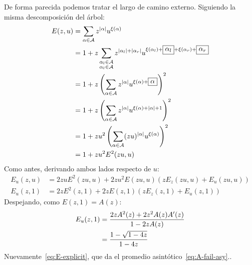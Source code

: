   De forma parecida podemos tratar el largo de camino externo.%
  Siguiendo la misma descomposición del árbol:
  \begin{align}
    E(z, u)
      &= \sum_{\alpha \in \mathcal{A}}
	   z^{\lvert \alpha \rvert} u^{\xi(\alpha)}
	   \label{E-bgf-decomposed} \\
      &= 1 + z \sum_{\substack{\alpha_l \in \mathcal{A} \\
			       \alpha_l \in \mathcal{A}}}
		 z^{\lvert \alpha_l \rvert + \lvert \alpha_r \rvert}
		 u^{\xi(\alpha_l) + \boxed{\alpha_l}
		     + \xi(\alpha_r) + \boxed{\alpha_r}} \notag \\
      &= 1 + z \left(
		 \sum_{\alpha \in \mathcal{A}}
		   z^{\lvert \alpha \rvert}
		   u^{\xi(\alpha) + \boxed{\alpha}}
	       \right)^2 \notag \\
      &= 1 + z \left(
		 \sum_{\alpha \in \mathcal{A}}
		   z^{\lvert \alpha \rvert}
		   u^{\xi(\alpha) + \lvert \alpha \rvert + 1}
	       \right)^2 \notag \\
      &= 1 + z u^2 \left(
		     \sum_{\alpha \in \mathcal{A}}
		       (z u)^{\lvert \alpha \rvert}
		       u^{\xi(\alpha)}
		   \right)^2 \notag \\
      &= 1 + z u^2 E^2(z u, u)
	   \label{eq:E-bgf-decomposed-result}
  \end{align}
  Como antes,
  derivando ambos lados respecto de \(u\):
  \begin{align*}
    E_u(z, u)
      &= 2 z u E^2(z u, u)
	  + 2 z u^2 E(z u, u) ( z E_z(z u, u) + E_u(z u, u)) \\
    E_u(z, 1)
      &= 2 z E^2(z, 1)
	  + 2 z E(z, 1) ( z E_z(z, 1) + E_u(z, 1))
  \end{align*}
  Despejando,
  como \(E(z, 1) = A(z)\):
  \begin{align}
    E_u(z, 1)
      &= \frac{2 z A^2(z) + 2 z^2 A(z) A'(z)}{1 - 2 z A(z)} \notag \\
      &= \frac{1 - \sqrt{1 - 4 z}}{1 - 4 z}
	 \label{eq:E-bgf_u|u=1-asy}
  \end{align}
  Nuevamente~\eqref{eq:E-explicit},
  que da el promedio asintótico~\eqref{eq:A-fail-asy}..


